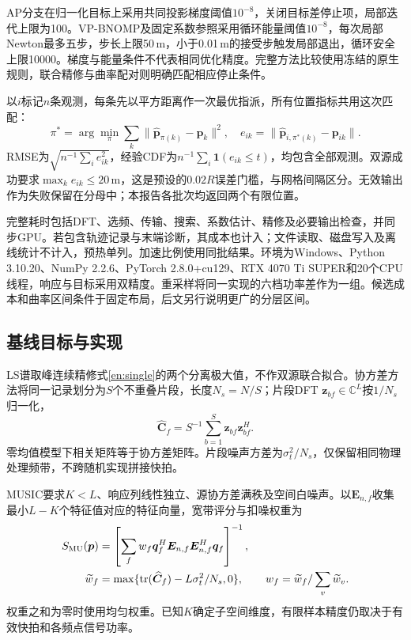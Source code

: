 \documentclass[a4paper,fleqn]{cas-sc}
\newcommand{\C}{\mathbb C}
\newcommand{\tr}{\operatorname{tr}}
\begin{document}
AP分支在归一化目标上采用共同投影梯度阈值$10^{-8}$，关闭目标差停止项，局部迭代上限为100。VP-BNOMP及固定系数参照采用循环能量阈值$10^{-8}$，每次局部Newton最多五步，步长上限50\,m，小于0.01\,m的接受步触发局部退出，循环安全上限10000。梯度与能量条件不代表相同优化精度。完整方法比较使用冻结的原生规则，联合精修与曲率配对则明确匹配相应停止条件。

以$i$标记$n$条观测，每条先以平方距离作一次最优指派\cite{Kuhn1955}，所有位置指标共用这次匹配：
\begin{equation}
\pi^*=\arg\min_\pi\sum_k\|\widehat{\bm p}_{\pi(k)}-\bm p_k\|^2,
\quad e_{ik}=\|\widehat{\bm p}_{i,\pi^*(k)}-\bm p_{ik}\|.
\end{equation}
RMSE为$\sqrt{n^{-1}\sum_i e_{ik}^2}$，经验CDF为$n^{-1}\sum_i\mathbf1(e_{ik}\le t)$，均包含全部观测。双源成功要求$\max_k e_{ik}\le20$\,m，这是预设的$0.02R$误差门槛，与网格间隔区分。无效输出作为失败保留在分母中；本报告各批次均返回两个有限位置。

完整耗时包括DFT、选频、传输、搜索、系数估计、精修及必要输出检查，并同步GPU。若包含轨迹记录与末端诊断，其成本也计入；文件读取、磁盘写入及离线统计不计入，预热单列。加速比例使用同批结果。环境为Windows、Python 3.10.20、NumPy 2.2.6、PyTorch 2.8.0+cu129、RTX 4070 Ti SUPER和20个CPU线程，响应与目标采用双精度。重采样将同一实现的六档功率差作为一组。候选成本和曲率区间条件于固定布局，后文另行说明更广的分层区间。

\FloatBarrier
\subsection{基线目标与实现}
LS谱取峰连续精修式\eqref{en:single}的两个分离极大值，不作双源联合拟合。协方差方法将同一记录划分为$S$个不重叠片段，长度$N_s=N/S$；片段DFT $\bm z_{bf}\in\C^L$按$1/N_s$归一化，
\begin{equation}
\widehat{\bm C}_f=S^{-1}\sum_{b=1}^S\bm z_{bf}\bm z_{bf}^H.
\end{equation}
零均值模型下相关矩阵等于协方差矩阵。片段噪声方差为$\sigma_t^2/N_s$，仅保留相同物理处理频带，不跨随机实现拼接快拍。

MUSIC要求$K<L$、响应列线性独立、源协方差满秩及空间白噪声\cite{WeissAmar2005}。以$\bm E_{n,f}$收集最小$L-K$个特征值对应的特征向量，宽带评分与扣噪权重为
\begin{align}
S_{\rm MU}(\bm p)&=\left[\sum_f w_f\bm q_f^H
\bm E_{n,f}\bm E_{n,f}^H\bm q_f\right]^{-1},\\
\widetilde w_f&=\max\{\tr(\widehat{\bm C}_f)-L\sigma_t^2/N_s,0\},
\qquad w_f=\widetilde w_f/\sum_v\widetilde w_v.
\end{align}
权重之和为零时使用均匀权重。已知$K$确定子空间维度，有限样本精度仍取决于有效快拍和各频点信号功率。
\end{document}
